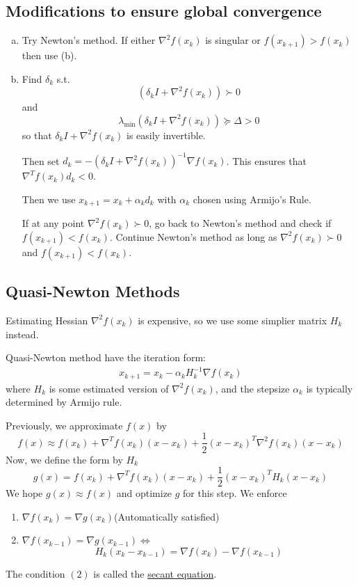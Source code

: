 \documentclass[11pt,a4paper]{article}
\begin{document}
\subsection{Modifications to ensure global convergence}
\begin{enumerate}[(a)]
    \item Try Newton's method. If either $\nabla^2 f(x_k)$ is singular or $f(x_{k+1})>f(x_{k})$ then use (b).
    \item Find $\delta_k$ s.t. $$(\delta_k I+\nabla^2 f(x_k))\succ 0$$ and $$\lambda_{\min}(\delta_k I+\nabla^2 f(x_k))\succeq \Delta >0$$ so that $\delta_k I+\nabla^2 f(x_k)$ is easily invertible.
    
    Then set $d_k=-(\delta_k I+\nabla^2 f(x_k))^{-1}\nabla f(x_k)$. This ensures that $\nabla^T f(x_k)d_k<0$.

    Then we use $x_{k+1}=x_k+\alpha_k d_k$ with $\alpha_k$ chosen using Armijo's Rule.

    If at any point $\nabla^2 f(x_k)\succ 0$, go back to Newton's method and check if $f(x_{k+1})<f(x_k)$. Continue Newton's method as long as $\nabla^2 f(x_k)\succ 0$ and $f(x_{k+1})<f(x_{k})$.
\end{enumerate}

\subsection{Quasi-Newton Methods}
Estimating Hessian $\nabla^2 f(x_k)$ is expensive, so we use some simplier matrix $H_k$ instead.

Quasi-Newton method have the iteration form:
\begin{equation}
    \begin{aligned}
        x_{k+1}=x_k-\alpha_kH_k^{-1}\nabla f(x_k)
    \end{aligned}
    \nonumber
\end{equation}
where $H_k$ is some estimated version of $\nabla^2 f(x_k)$, and the stepsize $\alpha_k$ is typically determined by Armijo rule.

Previously, we approximate $f(x)$ by
$$f(x)\approx f(x_k)+\nabla^T f(x_k)(x-x_k)+\frac{1}{2}(x-x_k)^T \nabla^2 f(x_k) (x-x_k)$$
Now, we define the form by $H_k$
$$g(x)=f(x_k)+\nabla^T f(x_k)(x-x_k)+\frac{1}{2}(x-x_k)^T H_k (x-x_k)$$
We hope $g(x)\approx f(x)$ and optimize $g$ for this step. We enforce
\begin{enumerate}[(1)]
    \item $\nabla f(x_k)=\nabla g(x_k)$\quad  (Automatically satisfied)
    \item $\nabla f(x_{k-1})=\nabla g(x_{k-1})$\quad $\Leftrightarrow$\quad $$H_k(x_k-x_{k-1})=\nabla f(x_k)-\nabla f(x_{k-1})$$
\end{enumerate}
The condition $(2)$ is called the \underline{secant equation}.
\end{document}
